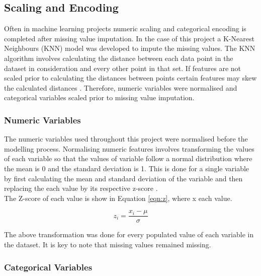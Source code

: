 \subsection{Scaling and Encoding}

Often in machine learning projects numeric scaling and categorical encoding is completed after missing value imputation. In the case of this project a K-Nearest Neighbours (KNN) model was developed to impute the missing values. The KNN algorithm involves calculating the distance between each data point in the dataset in consideration and every other point in that set. If features are not scaled prior to calculating the distances between points certain features may skew the calculated distances \parencite{KNNScaling}. Therefore, numeric variables were normalised and categorical variables scaled prior to missing value imputation. 

\subsubsection{Numeric Variables}

The numeric variables used throughout this project were normalised before the modelling process. Normalising numeric features involves transforming the values of each variable so that the values of variable follow a normal distribution where the mean is 0 and the standard deviation is 1. This is done for a single variable by first calculating the mean and standard deviation of the variable and then replacing the each value by its respective z-score \parencite{ZScore}. \\

The Z-score of each value is show in Equation \ref{eqn:z}, where x each value. 

\vspace{10pt}

\begin{equation}\label{eqn:z}
    z_{i} = \dfrac{x_{i}-\mu}{\sigma}
\end{equation}

\vspace{10pt}

The above transformation was done for every populated value of each variable in the dataset. It is key to note that missing values remained missing.  

\subsubsection{Categorical Variables}

